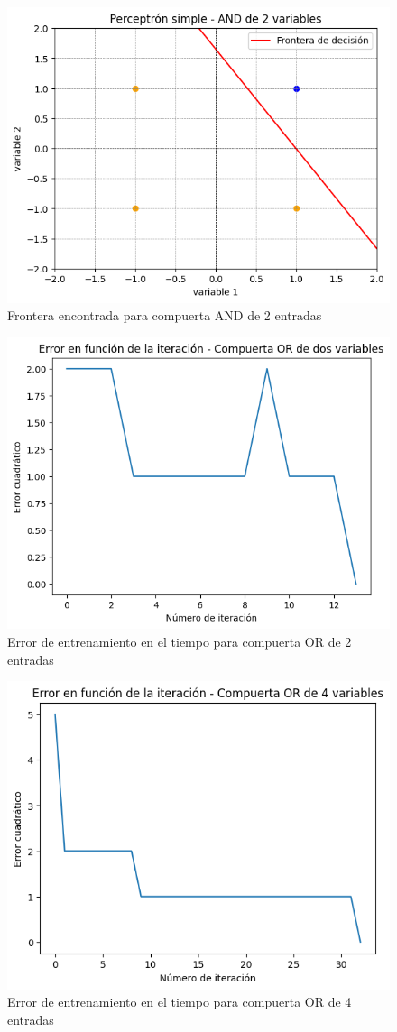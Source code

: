 \documentclass[11pt]{article} %
\begin{document}
\begin{figure}[h!]
	\centering
	\includegraphics[width=0.7\linewidth]{../imgs/ej1/ANDFRONT}
	\caption[]{Frontera encontrada para compuerta AND de 2 entradas}
	\label{fig:frontAND}
\end{figure}

\begin{figure}[h!]
	\centering
	\includegraphics[width=0.7\linewidth]{../imgs/ej1/OR2err}
	\caption[]{Error de entrenamiento en el tiempo para compuerta OR de 2 entradas}
	\label{fig:or2err}
\end{figure}

\begin{figure}[h!]
	\centering
	\includegraphics[width=0.7\linewidth]{../imgs/ej1/OR4}
	\caption[]{Error de entrenamiento en el tiempo para compuerta OR de 4 entradas}
	\label{fig:or4}
\end{figure}
\end{document}
